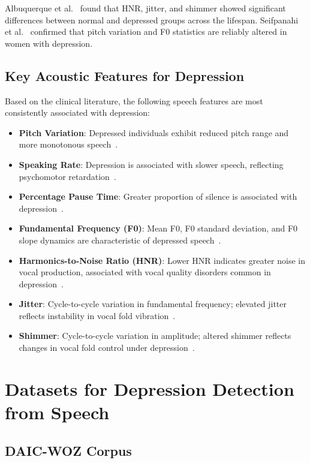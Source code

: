 Albuquerque et al.~\cite{Albuquerque2021} found that HNR, jitter, and shimmer showed significant differences between normal and depressed groups across the lifespan. Seifpanahi et al.~\cite{Seifpanahi2023} confirmed that pitch variation and F0 statistics are reliably altered in women with depression.

\subsection{Key Acoustic Features for Depression}

Based on the clinical literature, the following speech features are most consistently associated with depression:
\begin{itemize}
    \item \textbf{Pitch Variation}: Depressed individuals exhibit reduced pitch range and more monotonous speech~\cite{Seifpanahi2023}.
    \item \textbf{Speaking Rate}: Depression is associated with slower speech, reflecting psychomotor retardation~\cite{Cannizzaro2004}.
    \item \textbf{Percentage Pause Time}: Greater proportion of silence is associated with depression~\cite{Cannizzaro2004}.
    \item \textbf{Fundamental Frequency (F0)}: Mean F0, F0 standard deviation, and F0 slope dynamics are characteristic of depressed speech~\cite{France2000, Seifpanahi2023}.
    \item \textbf{Harmonics-to-Noise Ratio (HNR)}: Lower HNR indicates greater noise in vocal production, associated with vocal quality disorders common in depression~\cite{Albuquerque2021}.
    \item \textbf{Jitter}: Cycle-to-cycle variation in fundamental frequency; elevated jitter reflects instability in vocal fold vibration~\cite{Quatieri2012}.
    \item \textbf{Shimmer}: Cycle-to-cycle variation in amplitude; altered shimmer reflects changes in vocal fold control under depression~\cite{Quatieri2012}.
\end{itemize}

\section{Datasets for Depression Detection from Speech}

\subsection{DAIC-WOZ Corpus}

